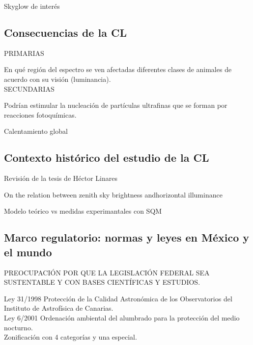 Skyglow de interés

\subsection{Consecuencias de la CL}

PRIMARIAS

En qué región del espectro se ven afectadas diferentes clases de animales de acuerdo con su visión (luminancia).\\

SECUNDARIAS

Podrían estimular la nucleación de partículas ultrafinas que se forman por reacciones fotoquímicas.

Calentamiento global 

\subsection{Contexto histórico del estudio de la CL}

Revisión de la tesis de Héctor Linares

On the relation between zenith sky brightness andhorizontal illuminance

Modelo teórico vs medidas experimantales con SQM

\subsection{Marco regulatorio: normas y leyes en México y el mundo}

PREOCUPACIÓN POR QUE LA LEGISLACIÓN FEDERAL SEA SUSTENTABLE Y CON BASES CIENTÍFICAS Y ESTUDIOS.

Ley 31/1998 Protección de la Calidad Astronómica de los Observatorios del Instituto de Astrofísica de Canarias.\\

Ley 6/2001 Ordenación ambiental del alumbrado para la protección del medio nocturno.\\

Zonificación con 4 categorías y una especial.\\

